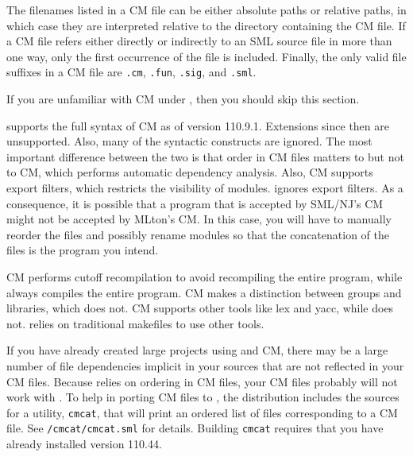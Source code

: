 The filenames listed in a CM file can be either absolute paths or
relative paths, in which case they are interpreted relative to the
directory containing the CM file.  If a CM file refers either directly
or indirectly to an SML source file in more than one way, only the
first occurrence of the file is included.  Finally, the only valid
file suffixes in a CM file are {\tt .cm}, {\tt .fun}, {\tt .sig}, and
{\tt .sml}.
%

If you are unfamiliar with CM under {\smlnj}, then you should skip this
section.

{\mlton} supports the full syntax of CM as of {\smlnj} version
110.9.1.  Extensions since then are unsupported.  Also, many of the
syntactic constructs are ignored.  The most important difference
between the two is that order in CM files matters to {\mlton} but not
to CM, which performs automatic dependency analysis.  Also, CM
supports export filters, which restricts the visibility of modules.
{\mlton} ignores export filters.  As a consequence, it is possible
that a program that is accepted by SML/NJ's CM might not be accepted
by MLton's CM.  In this case, you will have to manually reorder the
files and possibly rename modules so that the concatenation of the
files is the program you intend.

CM performs cutoff recompilation to avoid recompiling the entire
program, while {\mlton} always compiles the entire program.  CM makes
a distinction between groups and libraries, which {\mlton} does not.
CM supports other tools like lex and yacc, while {\mlton} does not.
{\mlton} relies on traditional makefiles to use other tools.
%

If you have already created large projects using {\smlnj} and CM,
there may be a large number of file dependencies implicit in your
sources that are not reflected in your CM files.  Because {\mlton}
relies on ordering in CM files, your CM files probably will not work
with {\mlton}.  To help in porting CM files to {\mlton}, the {\mlton}
distribution includes the sources for a utility, {\tt cmcat}, that
will print an ordered list of files corresponding to a CM file.  See
{\tt \doc/cmcat/cmcat.sml} for details.  Building {\tt cmcat} requires
that you have already installed {\smlnj} version 110.44.

